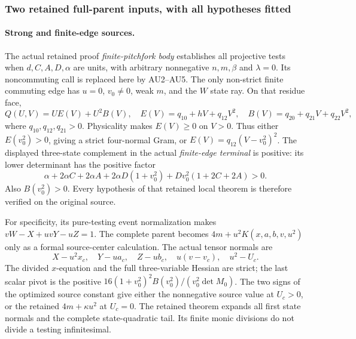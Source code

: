 \subsubsection*{Two retained full-parent inputs, with all hypotheses fitted}

\paragraph{Strong and finite-edge sources.}
The actual retained proof \emph{finite-pitchfork body} establishes
all projective tests when \(d,C,A,D,\alpha\) are units, with
arbitrary nonnegative \(n,m,\beta\) and \(\lambda=0\).
Its noncommuting call is replaced here by AU2--AU5.
The only non-strict finite commuting edge has \(u=0\), \(v_0\ne0\),
weak \(m\), and the \(W\) state ray. On that residue face,
\[
 Q(U,V)=U E(V)+U^2B(V),\quad
 E(V)=q_{10}+hV+q_{12}V^2,\quad
 B(V)=q_{20}+q_{21}V+q_{22}V^2,
 \tag{AU7}
\]
where \(q_{10},q_{12},q_{21}>0\).
Physicality makes \(E(V)\geq0\) on \(V>0\).
Thus either \(E(v_0^2)>0\), giving a strict four-normal Gram,
or \(E(V)=q_{12}(V-v_0^2)^2\).
The displayed three-state complement in the actual
\emph{finite-edge terminal} is positive: its lower determinant
has the positive factor
\[
 \alpha+2\alpha C+2\alpha A+2\alpha D(1+v_0^2)
                     +Dv_0^2(1+2C+2A)>0.
\]
Also \(B(v_0^2)>0\). Every hypothesis of that retained local
theorem is therefore verified on the original source.

For specificity, its pure-testing event normalization makes
\(vW-X+uvY-uZ=1\). The complete parent becomes
\(4m+u^2K(x,a,b,v,u^2)\) only as a formal source-center calculation.
The actual tensor normals are
\[
 X-u^2x_c,\quad Y-ua_c,\quad Z-ub_c,\quad
 u(v-v_c),\quad u^2-U_c .
 \tag{AU8}
\]
The divided \(x\)-equation and the full three-variable Hessian
are strict; the last scalar pivot is the positive
\(16(1+v_0^2)^2B(v_0^2)/(v_0^2\det M_0)\).
The two signs of the optimized source constant give either
the nonnegative source value at \(U_c>0\), or the retained
\(4m+\kappa u^2\) at \(U_c=0\).
The retained theorem expands all first state normals and the
complete state-quadratic tail. Its finite monic divisions do
not divide a testing infinitesimal.

